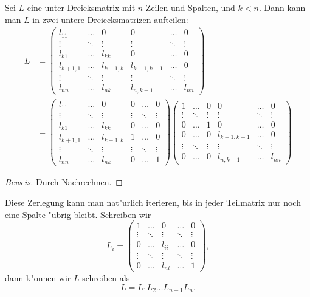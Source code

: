 \begin{hilfssatz}
Sei $L$ eine unter Dreicksmatrix mit $n$ Zeilen und Spalten, und $k<n$. 
Dann kann man $L$ in zwei untere Dreiecksmatrizen aufteilen:
\begin{align*}
L&=
\begin{pmatrix}
l_{11}   &\dots &0        &0          &\dots &0     \\
\vdots   &\ddots&\vdots   &\vdots     &\ddots&\vdots\\
l_{k1}   &\dots &l_{kk}   &0          &\dots &0     \\
l_{k+1,1}&\dots &l_{k+1,k}&l_{k+1,k+1}&\dots &0     \\
\vdots   &\ddots&\vdots   &\vdots     &\ddots&\vdots\\
l_{nn}   &\dots &l_{nk}   &l_{n,k+1}  &\dots &l_{nn}
\end{pmatrix}
\\
&=
\begin{pmatrix}
l_{11}   &\dots &0        &0          &\dots &0     \\
\vdots   &\ddots&\vdots   &\vdots     &\ddots&\vdots\\
l_{k1}   &\dots &l_{kk}   &0          &\dots &0     \\
l_{k+1,1}&\dots &l_{k+1,k}&1          &\dots &0     \\
\vdots   &\ddots&\vdots   &\vdots     &\ddots&\vdots\\
l_{nn}   &\dots &l_{nk}   &0          &\dots &1
\end{pmatrix}
\begin{pmatrix}
1        &\dots &0        &0          &\dots &0     \\
\vdots   &\ddots&\vdots   &\vdots     &\ddots&\vdots\\
0        &\dots &1        &0          &\dots &0     \\
0        &\dots &0        &l_{k+1,k+1}&\dots &0     \\
\vdots   &\ddots&\vdots   &\vdots     &\ddots&\vdots\\
0        &\dots &0        &l_{n,k+1}  &\dots &l_{nn}
\end{pmatrix}
\end{align*}
\end{hilfssatz}

\begin{proof}[Beweis]
Durch Nachrechnen.
\end{proof}

Diese Zerlegung kann man nat"urlich iterieren, bis in jeder Teilmatrix
nur noch eine Spalte "ubrig bleibt. Schreiben wir
\[
L_i=\begin{pmatrix}
1      &\dots &0     &\dots &0     \\
\vdots &\ddots&\vdots&\ddots&\vdots\\
0      &\dots &l_{ii}&\dots &0     \\
\vdots &\ddots&\vdots&\ddots&\vdots\\
0      &\dots &l_{ni}&\dots &1
\end{pmatrix},
\]
dann k"onnen wir $L$ schreiben als
\begin{equation}
L=L_1L_2\dots L_{n-1}L_n.
\label{lproductdecomposition}
\end{equation}

